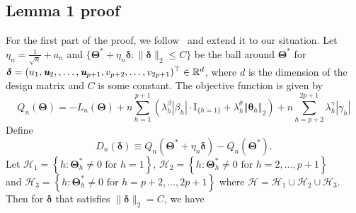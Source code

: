 \documentclass[12pt,letter]{article}\usepackage[]{graphicx}\usepackage[]{color}
\newcommand{\bTheta}{\boldsymbol{\Theta}}
\newcommand{\btheta}{\boldsymbol{\theta}}
\newcommand{\bThetastar}{\boldsymbol{\Theta}^{*}}
\newcommand{\bdelta}{\boldsymbol{\delta}}
\begin{document}
\subsection{Lemma 1 proof}
For the first part of the proof, we follow~\citep{fan2001variable,choi2010variable,nardi2008asymptotic,wang2007regression} and extend it to our situation. Let $\eta_{n}=\frac{1}{\sqrt{n}}+a_{n}$ and $\{\bTheta^{*}+\eta_{n}\boldsymbol{\delta}:\|\boldsymbol{\delta}\|_2\leq C\}$
be the ball around $\bTheta^{*}$ for $\boldsymbol{\delta}=(u_{1}, \textit{\textbf{u}}_2, ,\ldots, \textit{\textbf{u}}_{p+1},v_{p+2},\ldots,v_{2p+1})^{\top} \in \mathbb{R}^d$, where $d$ is the dimension of the design matrix and $C$ is some constant. The objective function is given by
\begin{equation*}
Q_n(\bTheta)
=-L_n(\bTheta)+n\sum_{h=1}^{p+1} \left( \lambda_{h}^{\beta}\left|\beta_{h}\right| \cdot \textrm{I}_{\lbrace h=1 \rbrace} +   \lambda_{h}^{\theta}\left\Vert \btheta_{h}\right\Vert _{2}\right)  +n\sum_{h=p+2}^{2p+1}\lambda_{h}^{\gamma}\left|\gamma_{h}\right|
\end{equation*}
Define 
\[ D_{n}(\boldsymbol{\delta})\equiv Q_{n}(\bThetastar+\eta_{n}\bdelta)-Q_{n}(\bThetastar).\] Let $\mathcal{H}_1=\left\lbrace h : \bThetastar_h \neq 0 \textrm{ for }h=1 \right\rbrace$, $\mathcal{H}_2=\left\lbrace h : \bThetastar_h \neq 0 \textrm{ for }h=2, \ldots, p+1 \right\rbrace$ \\and $\mathcal{H}_3=\left\lbrace h : \bThetastar_h \neq 0 \textrm{ for }h=p+2, \ldots, 2p+1 \right\rbrace$ where $\mathcal{H} = \mathcal{H}_1 \cup \mathcal{H}_2 \cup \mathcal{H}_3$. Then for $\bdelta$ that satisfies $\|\bdelta\|_2=C$, we have
\end{document}

